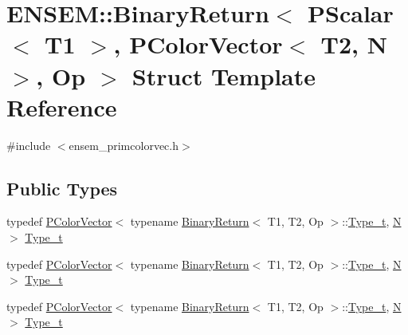 \hypertarget{structENSEM_1_1BinaryReturn_3_01PScalar_3_01T1_01_4_00_01PColorVector_3_01T2_00_01N_01_4_00_01Op_01_4}{}\section{E\+N\+S\+EM\+:\+:Binary\+Return$<$ P\+Scalar$<$ T1 $>$, P\+Color\+Vector$<$ T2, N $>$, Op $>$ Struct Template Reference}
\label{structENSEM_1_1BinaryReturn_3_01PScalar_3_01T1_01_4_00_01PColorVector_3_01T2_00_01N_01_4_00_01Op_01_4}


{\ttfamily \#include $<$ensem\+\_\+primcolorvec.\+h$>$}

\subsection*{Public Types}
\begin{DoxyCompactItemize}
\item 
typedef \mbox{\hyperlink{classENSEM_1_1PColorVector}{P\+Color\+Vector}}$<$ typename \mbox{\hyperlink{structENSEM_1_1BinaryReturn}{Binary\+Return}}$<$ T1, T2, Op $>$\+::\mbox{\hyperlink{structENSEM_1_1BinaryReturn_3_01PScalar_3_01T1_01_4_00_01PColorVector_3_01T2_00_01N_01_4_00_01Op_01_4_a95a5d5601624cef9fdaf1ef812aec166}{Type\+\_\+t}}, \mbox{\hyperlink{adat__devel_2lib_2hadron_2operator__name__util_8cc_a7722c8ecbb62d99aee7ce68b1752f337}{N}} $>$ \mbox{\hyperlink{structENSEM_1_1BinaryReturn_3_01PScalar_3_01T1_01_4_00_01PColorVector_3_01T2_00_01N_01_4_00_01Op_01_4_a95a5d5601624cef9fdaf1ef812aec166}{Type\+\_\+t}}
\item 
typedef \mbox{\hyperlink{classENSEM_1_1PColorVector}{P\+Color\+Vector}}$<$ typename \mbox{\hyperlink{structENSEM_1_1BinaryReturn}{Binary\+Return}}$<$ T1, T2, Op $>$\+::\mbox{\hyperlink{structENSEM_1_1BinaryReturn_3_01PScalar_3_01T1_01_4_00_01PColorVector_3_01T2_00_01N_01_4_00_01Op_01_4_a95a5d5601624cef9fdaf1ef812aec166}{Type\+\_\+t}}, \mbox{\hyperlink{adat__devel_2lib_2hadron_2operator__name__util_8cc_a7722c8ecbb62d99aee7ce68b1752f337}{N}} $>$ \mbox{\hyperlink{structENSEM_1_1BinaryReturn_3_01PScalar_3_01T1_01_4_00_01PColorVector_3_01T2_00_01N_01_4_00_01Op_01_4_a95a5d5601624cef9fdaf1ef812aec166}{Type\+\_\+t}}
\item 
typedef \mbox{\hyperlink{classENSEM_1_1PColorVector}{P\+Color\+Vector}}$<$ typename \mbox{\hyperlink{structENSEM_1_1BinaryReturn}{Binary\+Return}}$<$ T1, T2, Op $>$\+::\mbox{\hyperlink{structENSEM_1_1BinaryReturn_3_01PScalar_3_01T1_01_4_00_01PColorVector_3_01T2_00_01N_01_4_00_01Op_01_4_a95a5d5601624cef9fdaf1ef812aec166}{Type\+\_\+t}}, \mbox{\hyperlink{adat__devel_2lib_2hadron_2operator__name__util_8cc_a7722c8ecbb62d99aee7ce68b1752f337}{N}} $>$ \mbox{\hyperlink{structENSEM_1_1BinaryReturn_3_01PScalar_3_01T1_01_4_00_01PColorVector_3_01T2_00_01N_01_4_00_01Op_01_4_a95a5d5601624cef9fdaf1ef812aec166}{Type\+\_\+t}}
\end{DoxyCompactItemize}


